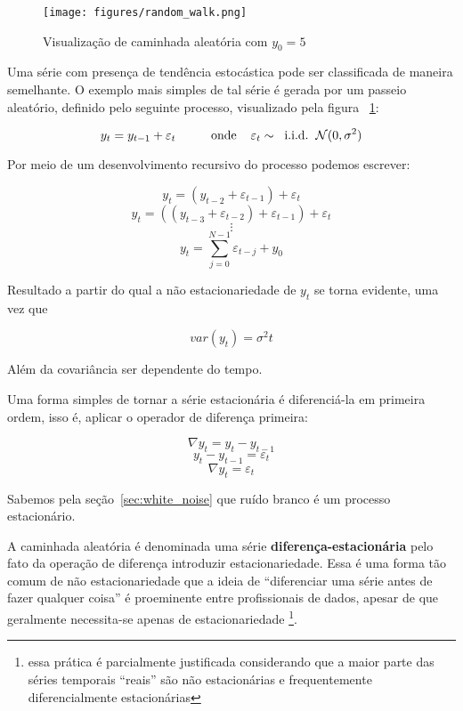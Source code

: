\begin{figure}[h]
    \centering
    \texttt{[image: figures/random\_walk.png]}
    \caption{Visualização de caminhada aleatória com $y_0=5$}
    \label{fig:random_walk}
\end{figure}

Uma série com presença de tendência estocástica pode ser classificada de
maneira semelhante. O exemplo mais simples de tal série é gerada por um
passeio aleatório, definido pelo seguinte processo, visualizado pela figura
~\ref{fig:random_walk}:

$$  y_t = y_{t-1} + \varepsilon_t  \hspace{1cm}\text{onde} \hspace{.4cm}\varepsilon_t \sim \hspace{.2cm}\text{i.i.d.} \hspace{.2cm}\mathcal{N}(0, \sigma^2)$$

Por meio de um desenvolvimento recursivo do processo podemos escrever:

$$ y_t = (y_{t-2} + \varepsilon_{t-1}) + \varepsilon_{t} $$
$$ y_t = ((y_{t-3} + \varepsilon_{t-2}) + \varepsilon_{t-1}) + \varepsilon_{t} $$
$$ \vdots $$
$$ y_t = \sum_{j=0}^{N-1} \varepsilon_{t-j} + y_0$$
\vspace{1cm}

Resultado a partir do qual a não estacionariedade de $y_t$ se torna evidente,
uma vez que

$$ var(y_t) = \sigma^2 t $$

Além da covariância ser dependente do tempo.

Uma forma simples de tornar a série estacionária é diferenciá-la em primeira
ordem, isso é, aplicar o operador de diferença primeira:

$$ \nabla y_t = y_t - y_{t-1} $$
$$ y_t - y_{t-1} = \varepsilon_t$$
$$ \nabla y_t =  \varepsilon_t$$

Sabemos pela seção~\ref{sec:white_noise} que ruído branco é um processo
estacionário.

A caminhada aleatória é denominada uma série \textbf{diferença-estacionária}
pelo fato da operação de diferença introduzir estacionariedade. Essa é uma
forma tão comum de não estacionariedade que a ideia de ``diferenciar uma
série antes de fazer qualquer coisa'' é proeminente entre profissionais de
dados, apesar de que geralmente necessita-se apenas de estacionariedade
\footnote{essa prática é parcialmente justificada considerando que a maior
parte das séries temporais ``reais'' são não estacionárias e frequentemente
diferencialmente estacionárias}.

